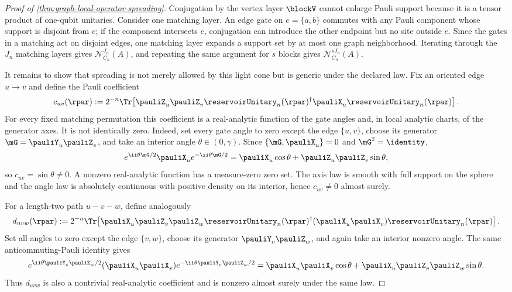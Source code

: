 \begin{proof}[Proof of \cref{thm:graph-local-operator-spreading}]
Conjugation by the vertex layer $\blockV$ cannot enlarge Pauli support because
it is a tensor product of one-qubit unitaries.  Consider one matching layer.
An edge gate on $e=\{a,b\}$ commutes with any Pauli component whose support is
disjoint from $e$; if the component intersects $e$, conjugation can introduce
the other endpoint but no site outside $e$.  Since the gates in a matching
act on disjoint edges, one matching layer expands a support set by at most one
graph neighborhood.  Iterating through the $J_n$ matching layers gives
$\mathcal N_{C_n}^{J_n}(A)$, and repeating the same argument for $s$ blocks
gives $\mathcal N_{C_n}^{sJ_n}(A)$.

It remains to show that spreading is not merely allowed by this light cone but
is generic under the declared law.  Fix an oriented edge $u\to v$ and define
the Pauli coefficient
\[
    c_{uv}(\rpar)
    :=2^{-n}\Tr\!\left[
      \pauliZ_u\pauliZ_v
      \reservoirUnitary_n(\rpar)^\dagger
      \pauliX_u
      \reservoirUnitary_n(\rpar)
    \right].
\]
For every fixed matching permutation this coefficient is a real-analytic
function of the gate angles and, in local analytic charts, of the generator
axes.  It is not identically zero.  Indeed, set every gate angle to zero except
the edge $\{u,v\}$, choose its generator
$\mG=\pauliY_u\pauliZ_v$, and take an interior angle
$\theta\in(0,\gamma)$.  Since $\{\mG,\pauliX_u\}=0$ and $\mG^2=\identity$,
\[
    e^{\ii\theta\mG/2}\pauliX_u e^{-\ii\theta\mG/2}
    =\pauliX_u\cos\theta+\pauliZ_u\pauliZ_v\sin\theta,
\]
so $c_{uv}=\sin\theta\neq0$.  A nonzero real-analytic function has a
measure-zero zero set.  The axis law is smooth with full support on the sphere
and the angle law is absolutely continuous with positive density on its
interior, hence $c_{uv}\neq0$ almost surely.

For a length-two path $u-v-w$, define analogously
\[
    d_{uvw}(\rpar)
    :=2^{-n}\Tr\!\left[
      \pauliX_u\pauliZ_v\pauliZ_w
      \reservoirUnitary_n(\rpar)^\dagger
      (\pauliX_u\pauliX_v)
      \reservoirUnitary_n(\rpar)
    \right].
\]
Set all angles to zero except the edge $\{v,w\}$, choose its generator
$\pauliY_v\pauliZ_w$, and again take an interior nonzero angle.  The same
anticommuting-Pauli identity gives
\[
    e^{\ii\theta\pauliY_v\pauliZ_w/2}
      (\pauliX_u\pauliX_v)
    e^{-\ii\theta\pauliY_v\pauliZ_w/2}
    =\pauliX_u\pauliX_v\cos\theta
      +\pauliX_u\pauliZ_v\pauliZ_w\sin\theta.
\]
Thus $d_{uvw}$ is also a nontrivial real-analytic coefficient and is nonzero
almost surely under the same law.
\end{proof}

